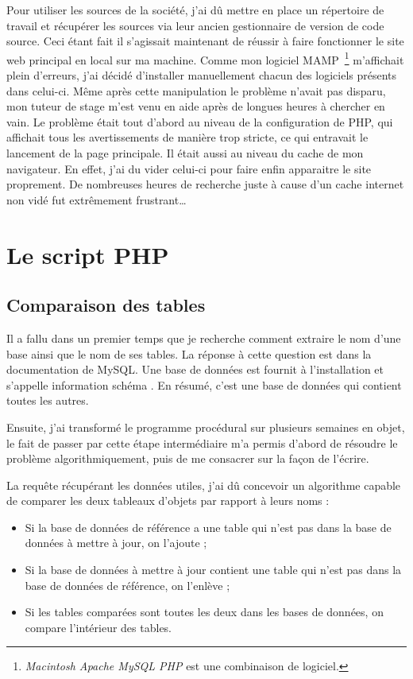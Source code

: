 Pour utiliser les sources de la société, j'ai dû mettre en place un répertoire
de travail et récupérer les sources via leur ancien gestionnaire de version de
code source. Ceci étant fait il s'agissait maintenant de réussir à faire
fonctionner le site web principal en local sur ma machine. Comme mon logiciel
MAMP\, \footnote{\emph{Macintosh Apache MySQL PHP} est une combinaison de
logiciel.} m'affichait plein d'erreurs, j'ai décidé d'installer manuellement
chacun des logiciels présents dans celui-ci. Même après cette manipulation le
problème n'avait pas disparu, mon tuteur de stage m'est venu en aide après de
longues heures à chercher en vain. Le problème était tout d'abord au niveau de
la configuration de PHP, qui affichait tous les avertissements de manière trop
stricte, ce qui entravait le lancement de la page principale. Il était aussi au
niveau du cache de mon navigateur. En effet, j'ai du vider celui-ci pour faire
enfin apparaitre le site proprement. De nombreuses heures de recherche juste à
cause d'un cache internet non vidé fut extrêmement frustrant\dots

\section{Le script PHP} %
\label{sec:Le script PHP}

\subsection{Comparaison des tables} %
\label{sub:Comparaison des tables}

Il a fallu dans un premier temps que je recherche comment extraire le nom d'une
base ainsi que le nom de ses tables. La réponse à cette question est dans la
documentation de MySQL. Une base de données est fournit à l'installation et
s'appelle \og information schéma \fg{} . En résumé, c'est une base de données
qui contient toutes les autres.

Ensuite, j'ai transformé le programme procédural sur plusieurs semaines en
objet, le fait de passer par cette étape intermédiaire m'a permis d'abord de
résoudre le problème algorithmiquement, puis de me consacrer sur la façon de
l'écrire.

La requête récupérant les données utiles, j'ai dû concevoir un algorithme
capable de comparer les deux tableaux d'objets par rapport à leurs noms :
\begin{itemize}
    \item Si la base de données de référence a une table qui n'est pas dans
    la base de données à mettre à jour, on l'ajoute ;
    \item Si la base de données à mettre à jour contient une table qui n'est
    pas dans la base de données de référence, on l'enlève ;
    \item Si les tables comparées sont toutes les deux dans les bases de
    données, on compare l'intérieur des tables.
\end{itemize}

